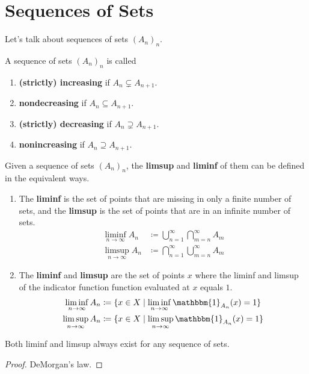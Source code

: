 \section{Sequences of Sets}

  Let's talk about sequences of sets $(A_n)_n$. 

  \begin{definition}
    A sequence of sets $(A_n)_n$ is called 
    \begin{enumerate}
      \item \textbf{(strictly) increasing} if $A_n \subsetneq A_{n+1}$. 
      \item \textbf{nondecreasing} if $A_n \subseteq A_{n+1}$. 
      \item \textbf{(strictly) decreasing} if $A_n \supsetneq A_{n+1}$. 
      \item \textbf{nonincreasing} if $A_n \supseteq A_{n+1}$. 
    \end{enumerate}
  \end{definition}

  \begin{definition}
    Given a sequence of sets $(A_n)_n$, the \textbf{limsup} and \textbf{liminf} of them can be defined in the equivalent ways. 
    \begin{enumerate}
      \item The \textbf{liminf} is the set of points that are missing in only a finite number of sets, and the \textbf{limsup} is the set of points that are in an infinite number of sets. 
      \begin{align}
        \liminf_{n \to \infty} A_n & \coloneqq \bigcup_{n=1}^\infty \bigcap_{m=n}^\infty A_m \\
        \limsup_{n \to \infty} A_n & \coloneqq \bigcap_{n=1}^\infty \bigcup_{m=n}^\infty A_m 
      \end{align} 

      \item The \textbf{liminf} and \textbf{limsup} are the set of points $x$ where the liminf and limsup of the indicator function function evaluated at $x$ equals $1$. 
        \begin{align}
          \liminf_{n \to \infty} A_n & \coloneqq \{x \in X \mid \liminf_{n \to \infty} \mathbbm{1}_{A_n} (x) = 1 \} \\ 
          \limsup_{n \to \infty} A_n & \coloneqq \{x \in X \mid \limsup_{n \to \infty} \mathbbm{1}_{A_n} (x) = 1 \}
        \end{align}

    \end{enumerate}
    Both liminf and limsup always exist for any sequence of sets. 
  \end{definition} 
  \begin{proof}
    DeMorgan's law. 
  \end{proof}


